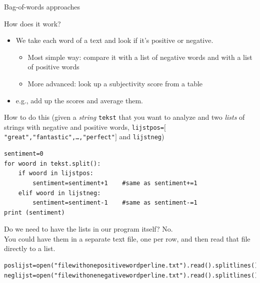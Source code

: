 \documentclass{beamer}
\begin{document}
\begin{frame}{Bag-of-words approaches}
	\begin{block}{How does it work?}
		\begin{itemize}
			\item We take each word of a text and look if it's positive or negative.
			\begin{itemize}
				\item<2-> Most simple way: compare it with a list of negative words and with a list of positive words %
				\item<3-> More advanced: look up a subjectivity score from a table 
			\end{itemize}
			\item<4-> e.g., add up the scores and average them.
		\end{itemize}
	\end{block}
\end{frame}

%

\begin{frame}[fragile]{How to do this}
\scriptsize{ 
	(given a \emph{string} \texttt{tekst} that you want to analyze and two 
	\emph{lists} of strings with negative and positive words, 
	\texttt{lijstpos=$[$"great","fantastic",\ldots,"perfect"$]$} and \texttt{lijstneg})\\
}

\begin{lstlisting}
sentiment=0
for woord in tekst.split():
    if woord in lijstpos:
        sentiment=sentiment+1    #same as sentiment+=1
    elif woord in lijstneg:
        sentiment=sentiment-1    #same as sentiment-=1
print (sentiment)
\end{lstlisting}
\end{frame}


\begin{frame}[fragile]{Do we need to have the lists in our program itself?}
No.\\
You could have them in a separate text file, one per row, and then read that file directly to a list.\\
\begin{lstlisting}
poslijst=open("filewithonepositivewordperline.txt").read().splitlines()
neglijst=open("filewithonenegativewordperline.txt").read().splitlines()
\end{lstlisting}
\end{frame}
\end{document}
